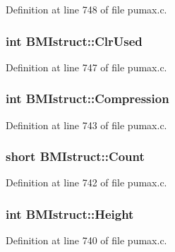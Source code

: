 \-Definition at line 748 of file pumax.\-c.

\hypertarget{struct_b_m_istruct_a8f8f9ef7e30ba0653ba479b28676c3ce}{
\subsubsection[{\-Clr\-Used}]{\setlength{\rightskip}{0pt plus 5cm}int {\bf \-B\-M\-Istruct\-::\-Clr\-Used}}}
\label{struct_b_m_istruct_a8f8f9ef7e30ba0653ba479b28676c3ce}


\-Definition at line 747 of file pumax.\-c.

\hypertarget{struct_b_m_istruct_a28c320842950835ff4de540ed4c4b4fd}{
\subsubsection[{\-Compression}]{\setlength{\rightskip}{0pt plus 5cm}int {\bf \-B\-M\-Istruct\-::\-Compression}}}
\label{struct_b_m_istruct_a28c320842950835ff4de540ed4c4b4fd}


\-Definition at line 743 of file pumax.\-c.

\hypertarget{struct_b_m_istruct_a116a68a16b53430a1a9f0bdf657e53c8}{
\subsubsection[{\-Count}]{\setlength{\rightskip}{0pt plus 5cm}short {\bf \-B\-M\-Istruct\-::\-Count}}}
\label{struct_b_m_istruct_a116a68a16b53430a1a9f0bdf657e53c8}


\-Definition at line 742 of file pumax.\-c.

\hypertarget{struct_b_m_istruct_a52746e7d2f7de61866c6a2217083d1a5}{
\subsubsection[{\-Height}]{\setlength{\rightskip}{0pt plus 5cm}int {\bf \-B\-M\-Istruct\-::\-Height}}}
\label{struct_b_m_istruct_a52746e7d2f7de61866c6a2217083d1a5}


\-Definition at line 740 of file pumax.\-c.

